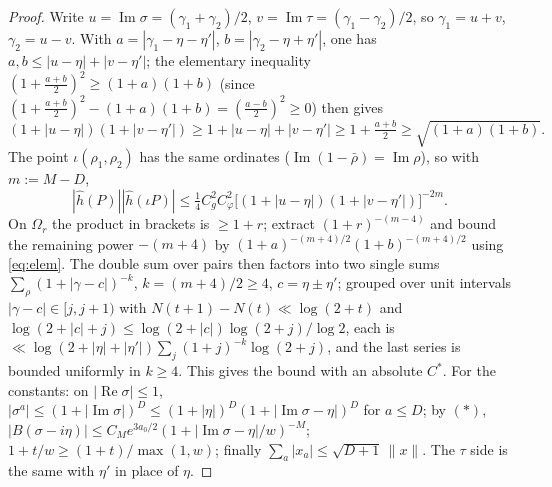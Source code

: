 \documentclass[11pt,reqno]{amsart}
\theoremstyle{definition}
\begin{document}
\begin{proof}
Write \(u=\operatorname{Im}\sigma=(\gamma_1+\gamma_2)/2\),
\(v=\operatorname{Im}\tau=(\gamma_1-\gamma_2)/2\), so \(\gamma_1=u+v\),
\(\gamma_2=u-v\). With \(a=|\gamma_1-\eta-\eta'|\), \(b=|\gamma_2-\eta+\eta'|\),
one has \(a,b\leq|u-\eta|+|v-\eta'|\); the elementary inequality
\((1+\tfrac{a+b}2)^2\geq(1+a)(1+b)\) (since
\((1+\tfrac{a+b}2)^2-(1+a)(1+b)=(\tfrac{a-b}2)^2\geq0\)) then gives
\begin{equation}\label{eq:elem}
(1+|u-\eta|)(1+|v-\eta'|)\geq 1+|u-\eta|+|v-\eta'|\geq1+\tfrac{a+b}2
\geq\sqrt{(1+a)(1+b)}.
\end{equation}
The point \(\iota(\rho_1,\rho_2)\) has the same ordinates
(\(\operatorname{Im}(1-\bar\rho)=\operatorname{Im}\rho\)), so with \(m:=M-D\),
\[
|\hat h(P)||\hat h(\iota P)|\leq\tfrac14 C_g^2C_\varphi^2
\bigl[(1+|u-\eta|)(1+|v-\eta'|)\bigr]^{-2m}.
\]
On \(\Omega_r\) the product in brackets is \(\geq1+r\); extract
\((1+r)^{-(m-4)}\) and bound the remaining power \(-(m+4)\) by
\((1+a)^{-(m+4)/2}(1+b)^{-(m+4)/2}\) using \eqref{eq:elem}. The double sum over
pairs then factors into two single sums
\(\sum_\rho(1+|\gamma-c|)^{-k}\), \(k=(m+4)/2\geq4\), \(c=\eta\pm\eta'\);
grouped over unit intervals \(|\gamma-c|\in[j,j+1)\) with
\(N(t+1)-N(t)\ll\log(2+t)\) and
\(\log(2+|c|+j)\leq\log(2+|c|)\log(2+j)/\log2\), each is
\(\ll\log(2+|\eta|+|\eta'|)\sum_j(1+j)^{-k}\log(2+j)\), and the last series is
bounded uniformly in \(k\geq4\). This gives the bound with an absolute
\(C^*\). For the constants: on \(|\operatorname{Re}\sigma|\leq1\),
\(|\sigma^a|\leq(1+|\operatorname{Im}\sigma|)^D\leq(1+|\eta|)^D
(1+|\operatorname{Im}\sigma-\eta|)^D\) for \(a\leq D\); by \((\ast)\),
\(|B(\sigma-i\eta)|\leq C_Me^{3a_0/2}(1+|\operatorname{Im}\sigma-\eta|/w)^{-M}\);
\(1+t/w\geq(1+t)/\max(1,w)\); finally \(\sum_a|x_a|\leq\sqrt{D+1}\,\|x\|\). The
\(\tau\) side is the same with \(\eta'\) in place of \(\eta\).
\end{proof}
\end{document}
